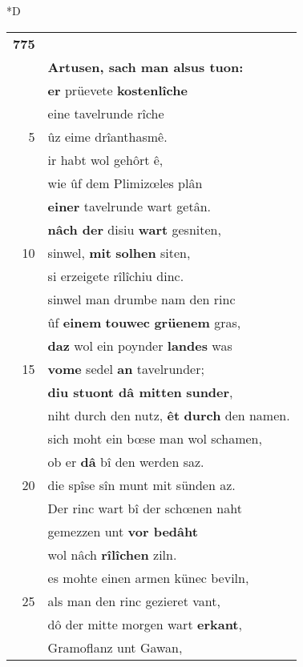 \documentclass[8pt,a4paper,notitlepage]{article}
\begin{document}
\begin{table}[ht]
\begin{minipage}[t]{0.5\linewidth}
\small
\begin{center}*D
\end{center}
\begin{tabular}{rl}
\textbf{775} & \textbf{\begin{large}U\end{large}tepandraguns sun,}\\ 
 & \textbf{Artusen, sach man alsus tuon:}\\ 
 & \textbf{er} prüevete \textbf{kostenlîche}\\ 
 & eine tavelrunde rîche\\ 
5 & ûz eime drîanthasmê.\\ 
 & ir habt wol gehôrt ê,\\ 
 & wie ûf dem Plimizœles plân\\ 
 & \textbf{einer} tavelrunde wart getân.\\ 
 & \textbf{nâch der} disiu \textbf{wart} gesniten,\\ 
10 & sinwel, \textbf{mit} \textbf{solhen} siten,\\ 
 & si erzeigete rîlîchiu dinc.\\ 
 & sinwel man drumbe nam den rinc\\ 
 & ûf \textbf{einem} \textbf{touwec} \textbf{grüenem} gras,\\ 
 & \textbf{daz} wol ein poynder \textbf{landes} was\\ 
15 & \textbf{vome} sedel \textbf{an} tavelrunder;\\ 
 & \textbf{diu stuont dâ mitten} \textbf{sunder},\\ 
 & niht durch den nutz, \textbf{êt} \textbf{durch} den namen.\\ 
 & sich moht ein bœse man wol schamen,\\ 
 & ob er \textbf{dâ} bî den werden saz.\\ 
20 & die spîse sîn munt mit sünden az.\\ 
 & Der rinc wart bî der schœnen naht\\ 
 & gemezzen unt \textbf{vor bedâht}\\ 
 & wol nâch \textbf{rîlîchen} ziln.\\ 
 & es mohte einen armen künec beviln,\\ 
25 & als man den rinc gezieret vant,\\ 
 & dô der mitte morgen wart \textbf{erkant},\\ 
 & Gramoflanz unt Gawan,\\ 

\end{tabular}
\end{minipage}
\end{table}
\end{document}
